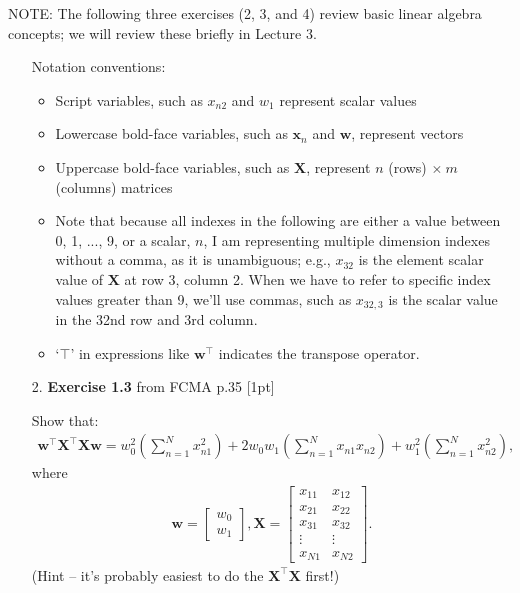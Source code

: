 \documentclass[10pt]{article}
\begin{document}
\newpage
NOTE: The following three exercises (2, 3, and 4) review basic linear algebra concepts; we will review these briefly in Lecture 3.  
\begin{enumerate}

\item[] Notation conventions:
\begin{itemize}
\item Script variables, such as $x_{n2}$ and $w_1$ represent scalar values
\item Lowercase bold-face variables, such as $\mathbf{x}_n$ and $\mathbf{w}$, represent vectors
\item Uppercase bold-face variables, such as $\mathbf{X}$, represent $n$ (rows) $\times ~m$ (columns) matrices
\item Note that because all indexes in the following are either a value between 0, 1, ..., 9, or a scalar, $n$, I am representing multiple dimension indexes without a comma, as it is unambiguous; e.g., $x_{32}$ is the element scalar value of $\mathbf{X}$ at row 3, column 2.  When we have to refer to specific index values greater than 9, we'll use commas, such as $x_{32,3}$ is the scalar value in the 32nd row and 3rd column.
\item `$\top$' in expressions like $\mathbf{w}^\top$ indicates the transpose operator.
\end{itemize}

\item[2.]
{\bf Exercise 1.3} from FCMA p.35  [1pt]

Show that:
\begin{eqnarray*}
\mathbf{w}^\top\mathbf{X}^\top\mathbf{X}\mathbf{w} = w_0^2 \left( \sum_{n=1}^N x_{n1}^2 \right) + 2w_0w_1 \left( \sum_{n=1}^N x_{n1}x_{n2} \right) + w_1^2 \left( \sum_{n=1}^N x_{n2}^2 \right),
\end{eqnarray*}
where
\begin{eqnarray*}
\mathbf{w} = 
    \begin{bmatrix}
    w_0 \\[0.3em]
    w_1
    \end{bmatrix}
    ,
\mathbf{X} = 
    \begin{bmatrix}
    x_{11} & x_{12} \\[0.3em]
    x_{21} & x_{22} \\[0.3em]
    x_{31} & x_{32} \\[0.3em]
    \vdots & \vdots \\[0.3em]
    x_{N1} & x_{N2}
    \end{bmatrix}
    .
\end{eqnarray*}
(Hint -- it's probably easiest to do the $\mathbf{X}^\top\mathbf{X}$ first!)


\end{enumerate}
\end{document}
